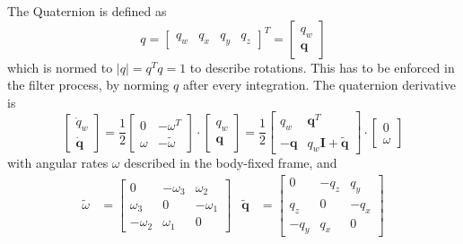 The Quaternion is defined as  
\begin{equation}
    q = \begin{bmatrix}
        q_w & q_x & q_y & q_z 
    \end{bmatrix}^T = 
    \begin{bmatrix}
        q_w \\ \bm q
    \end{bmatrix}
\end{equation}
which is normed to $|q| = q^T q =  1$ to describe rotations.
This has to be enforced in the filter process, by norming $q$ after every integration.
The quaternion derivative is \cite{zipfel2007, schiehlen2017}
\begin{equation}
    \begin{bmatrix}
       \dot q_w \\ \bm{\dot q}
    \end{bmatrix} 
    = \frac{1}{2}
    \begin{bmatrix}
        0 & -\omega^T  \\
        \omega & - \tilde \omega
    \end{bmatrix} \cdot 
    \begin{bmatrix}
        q_w \\ \bm q
    \end{bmatrix}
    = \frac{1}{2}
    \begin{bmatrix}
        q_w & \bm q^T  \\
        -\bm q & q_w \bm I + \bm{\tilde q}
    \end{bmatrix} \cdot 
    \begin{bmatrix}
        0 \\ \omega
    \end{bmatrix}
    \label{eq:quaternion-deriv}
\end{equation}
with angular rates $\omega$ described in the body-fixed frame, and 
\begin{align}
    \tilde \omega &= \begin{bmatrix}
        0 & -\omega_3 & \omega_2 \\
        \omega_3 & 0 & - \omega_1 \\
        -\omega_2 & \omega_1 & 0
    \end{bmatrix}    
    &
    \bm{\tilde q} &= \begin{bmatrix}
        0 & -q_z & q_y \\
        q_z & 0 & -q_x \\
        -q_y & q_x & 0
    \end{bmatrix}  
\end{align}
